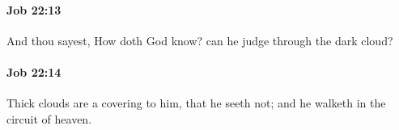 		\paragraph{Job 22:13} %
			\label{JOB-22-13}

			And thou sayest, How doth God know? can he judge through the dark cloud?


		\paragraph{Job 22:14} %
			\label{JOB-22-14}

			Thick clouds are a covering to him, that he seeth not; and he walketh in the circuit of heaven.



